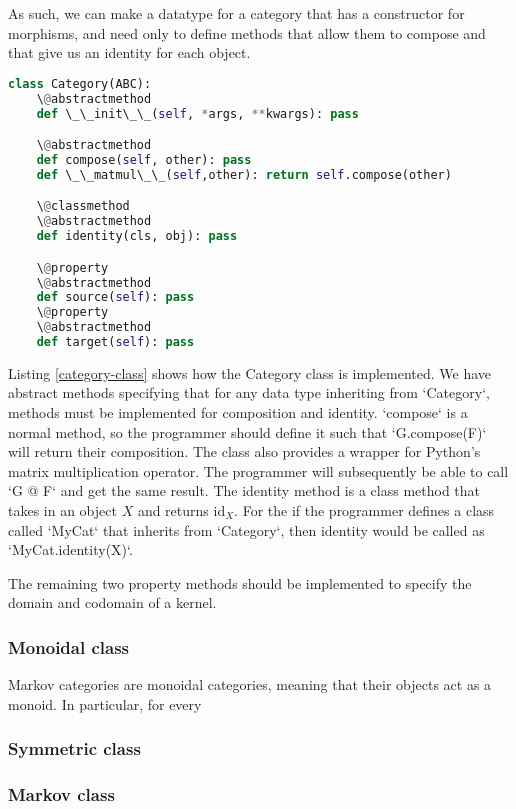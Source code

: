 As such, we can make a datatype for a category that has a constructor for morphisms, and need only to define methods that allow them to compose and that give us an identity for each object.

\begin{lstlisting}[caption=The category class within category.py, label=category-class, language=Python, frame=single]
class Category(ABC):
    \@abstractmethod
    def \_\_init\_\_(self, *args, **kwargs): pass

    \@abstractmethod
    def compose(self, other): pass
    def \_\_matmul\_\_(self,other): return self.compose(other)

    \@classmethod
    \@abstractmethod
    def identity(cls, obj): pass

    \@property
    \@abstractmethod
    def source(self): pass
    \@property
    \@abstractmethod
    def target(self): pass
\end{lstlisting}

Listing \ref{category-class} shows how the Category class is implemented.
We have abstract methods specifying that for any data type inheriting from `Category`, methods must be implemented for composition and identity.
`compose` is a normal method, so the programmer should define it such that `G.compose(F)` will return their composition.
The class also provides a wrapper for Python's matrix multiplication operator.
The programmer will subsequently be able to call `G @ F` and get the same result.
The identity method is a class method that takes in an object $X$ and returns $\mathrm{id}_X$.
For the if the programmer defines a class called `MyCat` that inherits from `Category`, then identity would be called as `MyCat.identity(X)`.

The remaining two property methods should be implemented to specify the domain and codomain of a kernel.

\subsubsection{Monoidal class}

Markov categories are monoidal categories, meaning that their objects act as a monoid.
In particular, for every 
\subsubsection{Symmetric class}
\subsubsection{Markov class}
